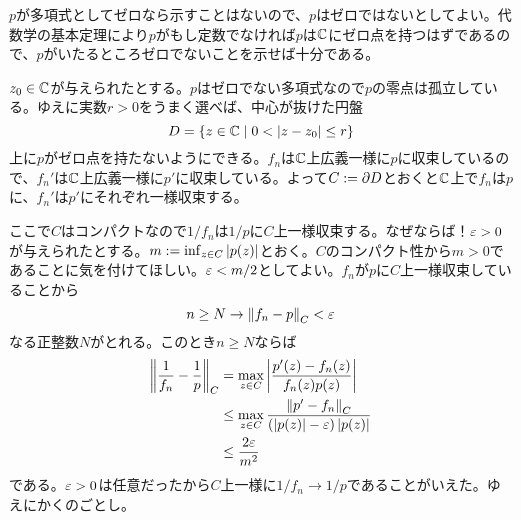 \subsubsection{}%
\begin{sol}
  $p$が多項式としてゼロなら示すことはないので、$p$はゼロではないとしてよい。代数学の基本定理により$p$がもし定数でなければ$p$は${\mathbb C}$にゼロ点を持つはずであるので、$p$がいたるところゼロでないことを示せば十分である。

  $z_0 \in {\mathbb C}$が与えられたとする。$p$はゼロでない多項式なので$p$の零点は孤立している。ゆえに実数$r > 0$をうまく選べば、中心が抜けた円盤
  \[
  D = \left\{  z \in {\mathbb C}  \mathrel{} \middle| \mathrel{} 0 < \left \lvert z - z_0 \right \rvert \leq r  \right\}
  \]
  上に$p$がゼロ点を持たないようにできる。$f_n$は${\mathbb C}$上広義一様に$p$に収束しているので、$f_n'$は${\mathbb C}$上広義一様に$p'$に収束している。よって$C := \partial D$とおくと${\mathbb C}$上で$f_n$は$p$に、$f_n'$は$p'$にそれぞれ一様収束する。

  ここで$C$はコンパクトなので$1/f_n$は$1/p$に$C$上一様収束する。なぜならば！${\varepsilon} > 0$が与えられたとする。$m := \inf_{z \in C} \left \lvert p(z) \right \rvert$とおく。$C$のコンパクト性から$m > 0$であることに気を付けてほしい。${\varepsilon} < m/2$としてよい。$f_n$が$p$に$C$上一様収束していることから
  \[
  n \geq N \to \left \lVert f_n - p \right \rVert_C < {\varepsilon}
  \]
  なる正整数$N$がとれる。このとき$n \geq N$ならば
  \begin{align*}
    \left \lVert  \frac{1}{f_n} - \frac{1}{p}  \right \rVert_C &= \max_{z \in C} \left \lvert  \frac{ p'(z) - f_n(z) }{  f_n(z) p(z) }   \right \rvert \\
    &\leq \max_{z \in C}  \frac{ \left \lVert  p' - f_n \right \rVert_C  }{  (\left \lvert p(z)  \right \rvert - {\varepsilon}) \left \lvert  p(z)  \right \rvert }   \\
    &\leq \frac{2 {\varepsilon} }{m^2}
  \end{align*}
  である。${\varepsilon} > 0$は任意だったから$C$上一様に$1/f_n \to 1/p$であることがいえた。ゆえにかくのごとし。


\end{sol}
